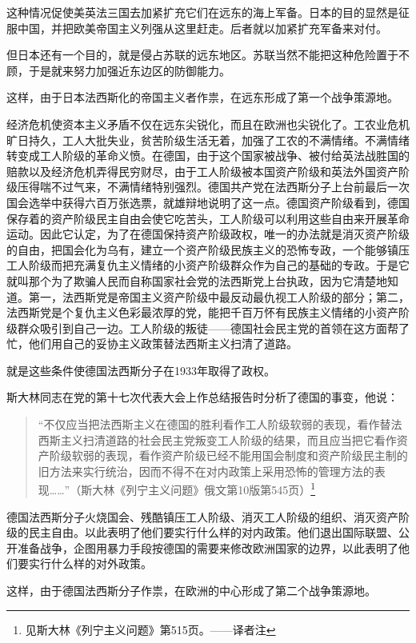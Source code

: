 这种情况促使美英法三国去加紧扩充它们在远东的海上军备。日本的目的显然是征服中国，并把欧美帝国主义列强从这里赶走。后者就以加紧扩充军备来对付。

但日本还有一个目的，就是侵占苏联的远东地区。苏联当然不能把这种危险置于不顾，于是就来努力加强近东边区的防御能力。

这样，由于日本法西斯化的帝国主义者作祟，在远东形成了第一个战争策源地。

经济危机使资本主义矛盾不仅在远东尖锐化，而且在欧洲也尖锐化了。工农业危机旷日持久，工人大批失业，贫苦阶级生活无着，加强了工农的不满情绪。不满情绪转变成工人阶级的革命义愤。在德国，由于这个国家被战争、被付给英法战胜国的赔款以及经济危机弄得民穷财尽，由于工人阶级被本国资产阶级和英法外国资产阶级压得喘不过气来，不满情绪特别强烈。德国共产党在法西斯分子上台前最后一次国会选举中获得六百万张选票，就雄辩地说明了这一点。德国资产阶级看到，德国保存着的资产阶级民主自由会使它吃苦头，工人阶级可以利用这些自由来开展革命运动。因此它认定，为了在德国保持资产阶级政权，唯一的办法就是消灭资产阶级的自由，把国会化为乌有，建立一个资产阶级民族主义的恐怖专政，一个能够镇压工人阶级而把充满复仇主义情绪的小资产阶级群众作为自己的基础的专政。于是它就叫那个为了欺骗人民而自称国家社会党的法西斯党上台执政，因为它清楚地知道。第一，法西斯党是帝国主义资产阶级中最反动最仇视工人阶级的部分；第二，法西斯党是个复仇主义色彩最浓厚的党，能把千百万怀有民族主义情绪的小资产阶级群众吸引到自己一边。工人阶级的叛徒——德国社会民主党的首领在这方面帮了忙，他们用自己的妥协主义政策替法西斯主义扫清了道路。

就是这些条件使德国法西斯分子在1933年取得了政权。

斯大林同志在党的第十七次代表大会上作总结报告时分析了德国的事变，他说：

\begin{quotation}
“不仅应当把法西斯主义在德国的胜利看作工人阶级软弱的表现，看作替法西斯主义扫清道路的社会民主党叛变工人阶级的结果，而且应当把它看作资产阶级软弱的表现，看作资产阶级已经不能用国会制度和资产阶级民主制的旧方法来实行统治，因而不得不在对内政策上采用恐怖的管理方法的表现……”（斯大林《列宁主义问题》俄文第10版第545页）\footnote{见斯大林《列宁主义问题》第515页。——译者注}
\end{quotation}

德国法西斯分子火烧国会、残酷镇压工人阶级、消灭工人阶级的组织、消灭资产阶级的民主自由。以此表明了他们要实行什么样的对内政策。他们退出国际联盟、公开准备战争，企图用暴力手段按德国的需要来修改欧洲国家的边界，以此表明了他们要实行什么样的对外政策。

这样，由于德国法西斯分子作祟，在欧洲的中心形成了第二个战争策源地。

